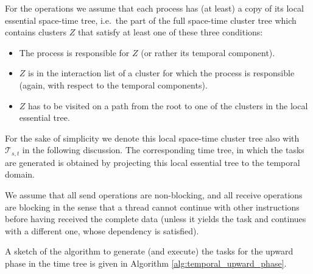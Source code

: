 \documentclass[a4paper,11pt]{article}
\theoremstyle{plain}
\theoremstyle{definition}
\theoremstyle{remark}
\begin{document}
For the operations we assume that each process has (at least) a copy of its local essential space-time tree, i.e.~the 
part of the full space-time cluster tree which contains clusters $Z$ that satisfy at least one of these three 
conditions:
\begin{itemize}
  \item The process is responsible for $Z$ (or rather its temporal component).
  \item $Z$ is in the interaction list of a cluster for which the process is responsible (again, with respect to the 
  temporal components).
  \item $Z$ has to be visited on a path from the root to one of the clusters in the local essential tree.
\end{itemize}
For the sake of simplicity we denote this local space-time cluster tree also with $\mathcal{T}_{s,t}$ in the following 
discussion. The corresponding time tree, in which the tasks are generated is obtained by projecting this local 
essential tree to the temporal domain.  

We assume that all send operations are non-blocking, and all receive operations are blocking in the sense that a thread
cannot continue with other instructions before having received the complete data (unless it yields the task and 
continues with a different one, whose dependency is satisfied).

A sketch of the algorithm to generate (and execute) the tasks for the upward phase in the time tree is given in
Algorithm \ref{alg:temporal_upward_phase}.
\end{document}
